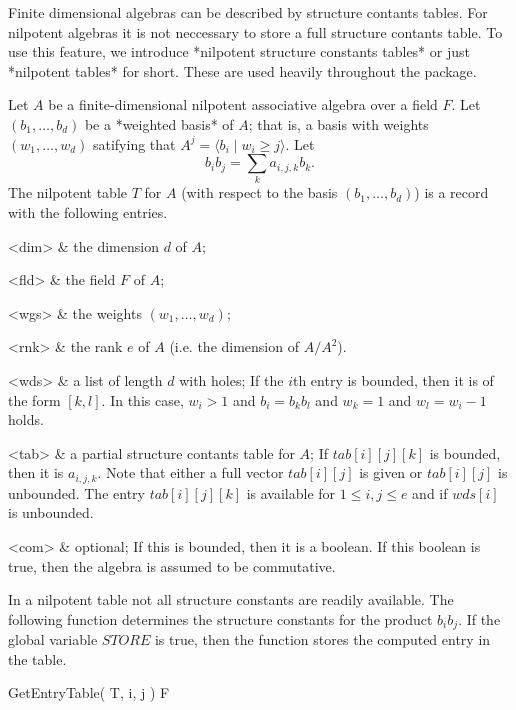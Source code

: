 

Finite dimensional algebras can be described by structure contants tables.
For nilpotent algebras it is not neccessary to store a full structure 
contants table. To use this feature, we introduce *nilpotent structure
constants tables* or just *nilpotent tables* for short. These are used 
heavily throughout the package.


Let $A$ be a finite-dimensional nilpotent associative algebra over a 
field $F$. Let $(b_1, \ldots, b_d)$ be a *weighted basis* of $A$; that
is, a basis with weights $(w_1, \ldots, w_d)$ satifying that $A^j = 
\langle b_i \mid w_i \geq j \rangle$. Let
$$ b_i b_j = \sum_k a_{i,j,k} b_k.$$
The nilpotent table $T$ for $A$ (with respect to the basis $(b_1,
\ldots, b_d)$) is a record with the following entries.

\beginitems
<dim> & 
   the dimension $d$ of $A$;

<fld> & 
   the field $F$ of $A$;

<wgs> & 
   the weights $(w_1, \ldots, w_d)$;

<rnk> &
   the rank $e$ of $A$ (i.e. the dimension of $A/A^2$).

<wds> & 
   a list of length $d$ with holes; If the $i$th entry is bounded, then 
   it is of the form $[k,l]$. In this case, $w_i > 1$ and $b_i = b_k b_l$ 
   and $w_k = 1$ and $w_l = w_i-1$ holds.
  
<tab> &
   a partial structure contants table for $A$; If $tab[i][j][k]$ is bounded,
   then it is $a_{i,j,k}$. Note that either a full vector $tab[i][j]$ is
   given or $tab[i][j]$ is unbounded. The entry $tab[i][j][k]$ is available
   for $1 \leq i,j \leq e$ and if $wds[i]$ is unbounded. 

<com> &
   optional; If this is bounded, then it is a boolean. If this boolean
   is true, then the algebra is assumed to be commutative.

\enditems

In a nilpotent table not all structure constants are readily available.
The following function determines the structure constants for the
product $b_i b_j$. If the global variable $STORE$ is true, then the
function stores the computed entry in the table.

\> GetEntryTable( T, i, j ) F


